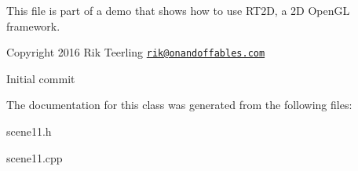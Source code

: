 This file is part of a demo that shows how to use R\+T2D, a 2D Open\+GL framework.


\begin{DoxyItemize}
\item Copyright 2016 Rik Teerling \href{mailto:rik@onandoffables.com}{\tt rik@onandoffables.\+com}
\begin{DoxyItemize}
\item Initial commit 
\end{DoxyItemize}
\end{DoxyItemize}

The documentation for this class was generated from the following files\+:\begin{DoxyCompactItemize}
\item 
scene11.\+h\item 
scene11.\+cpp\end{DoxyCompactItemize}
